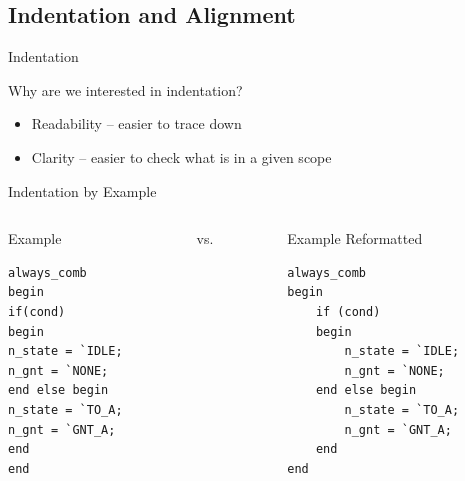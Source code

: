 \documentclass[dvipsnames]{beamer}
\begin{document}
\subsection{Indentation and Alignment}

\begin{frame}{Indentation}
	\begin{block}{Why are we interested in indentation?}
		\begin{itemize}
			\item Readability -- easier to trace down
			\item Clarity -- easier to check what is in a given scope
		\end{itemize}
	\end{block}
\end{frame}

\begin{frame}[fragile]{Indentation by Example}
	\begin{columns}
		\begin{column}[T]{0.35\textwidth}
			\begin{block}{Example}
				\vspace*{0pt}
				\begin{verbatim}
always_comb 
begin
if(cond) 
begin
n_state = `IDLE;
n_gnt = `NONE;
end else begin
n_state = `TO_A;
n_gnt = `GNT_A;
end
end
				\end{verbatim}
			\end{block}
		\end{column}
		\pause
		\begin{column}[T]{0.05\textwidth}
			\vspace*{0.3\textheight}
			\large{vs.}
			\normalsize
		\end{column}
		\begin{column}[T]{0.35\textwidth}
			\begin{block}{Example Reformatted}
				\vspace*{0pt}
				\begin{verbatim}
always_comb
begin
    if (cond)
    begin
        n_state = `IDLE;
        n_gnt = `NONE;
    end else begin
        n_state = `TO_A;
        n_gnt = `GNT_A;
    end
end
				\end{verbatim}
			\end{block}
		\end{column}
	\end{columns}
\end{frame}
\end{document}
